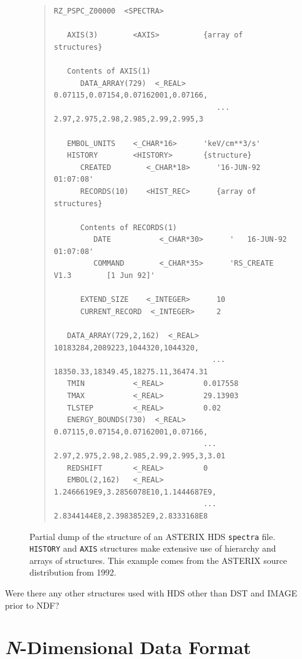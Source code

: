 \documentclass[final,authoryear,5p,times,twocolumn]{elsarticle}
\begin{document}
\begin{figure}[t]
\begin{minipage}{\textwidth}
\begin{quote}
\small
\begin{verbatim}
RZ_PSPC_Z00000  <SPECTRA>

   AXIS(3)        <AXIS>          {array of structures}

   Contents of AXIS(1)
      DATA_ARRAY(729)  <_REAL>       0.07115,0.07154,0.07162001,0.07166,
                                     ... 2.97,2.975,2.98,2.985,2.99,2.995,3

   EMBOL_UNITS    <_CHAR*16>      'keV/cm**3/s'
   HISTORY        <HISTORY>       {structure}
      CREATED        <_CHAR*18>      '16-JUN-92 01:07:08'
      RECORDS(10)    <HIST_REC>      {array of structures}

      Contents of RECORDS(1)
         DATE           <_CHAR*30>      '   16-JUN-92 01:07:08'
         COMMAND        <_CHAR*35>      'RS_CREATE V1.3        [1 Jun 92]'

      EXTEND_SIZE    <_INTEGER>      10
      CURRENT_RECORD  <_INTEGER>     2

   DATA_ARRAY(729,2,162)  <_REAL>   10183284,2089223,1044320,1044320,
                                    ... 18350.33,18349.45,18275.11,36474.31
   TMIN           <_REAL>         0.017558
   TMAX           <_REAL>         29.13903
   TLSTEP         <_REAL>         0.02
   ENERGY_BOUNDS(730)  <_REAL>    0.07115,0.07154,0.07162001,0.07166,
                                  ... 2.97,2.975,2.98,2.985,2.99,2.995,3,3.01
   REDSHIFT       <_REAL>         0
   EMBOL(2,162)   <_REAL>         1.2466619E9,3.2856078E10,1.1444687E9,
                                  ... 2.8344144E8,2.3983852E9,2.8333168E8
\end{verbatim}
\end{quote}
\caption{Partial dump of the structure of an ASTERIX HDS
  \texttt{spectra} file. \texttt{HISTORY} and \texttt{AXIS} structures
  make extensive use of hierarchy and arrays of structures.  This
  example comes from the ASTERIX source distribution from 1992.}
\label{fig:asterix}
\end{minipage}
\end{figure}

{\color{red} Were there any other structures used with HDS other than DST and IMAGE prior to NDF?}

\section{\emph{N}-Dimensional Data Format}
\end{document}
